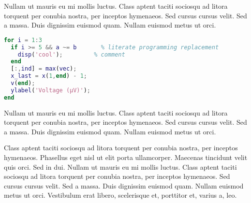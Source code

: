Nullam ut mauris eu mi mollis luctus. Class aptent taciti sociosqu ad litora torquent per conubia nostra, per inceptos hymenaeos. Sed cursus cursus velit. Sed a massa. Duis dignissim euismod quam. Nullam euismod metus ut orci.

\begin{lstlisting}[language=matlab,caption={{Matlab Function}}]
for i = 1:3
  if i >= 5 && a ~= b       % literate programming replacement
    disp('cool');         % comment
  end
  [:,ind] = max(vec);
  x_last = x(1,end) - 1;
  v(end);
  ylabel('Voltage (µV)');
end
\end{lstlisting}

Nullam ut mauris eu mi mollis luctus. Class aptent taciti sociosqu ad litora torquent per conubia nostra, per inceptos hymenaeos. Sed cursus cursus velit. Sed a massa. Duis dignissim euismod quam. Nullam euismod metus ut orci.



Class aptent taciti sociosqu ad litora torquent per conubia nostra, per inceptos hymenaeos. Phasellus eget nisl ut elit porta ullamcorper. Maecenas tincidunt velit quis orci. Sed in dui. Nullam ut mauris eu mi mollis luctus. Class aptent taciti sociosqu ad litora torquent per conubia nostra, per inceptos hymenaeos. Sed cursus cursus velit. Sed a massa. Duis dignissim euismod quam. Nullam euismod metus ut orci. Vestibulum erat libero, scelerisque et, porttitor et, varius a, leo.

